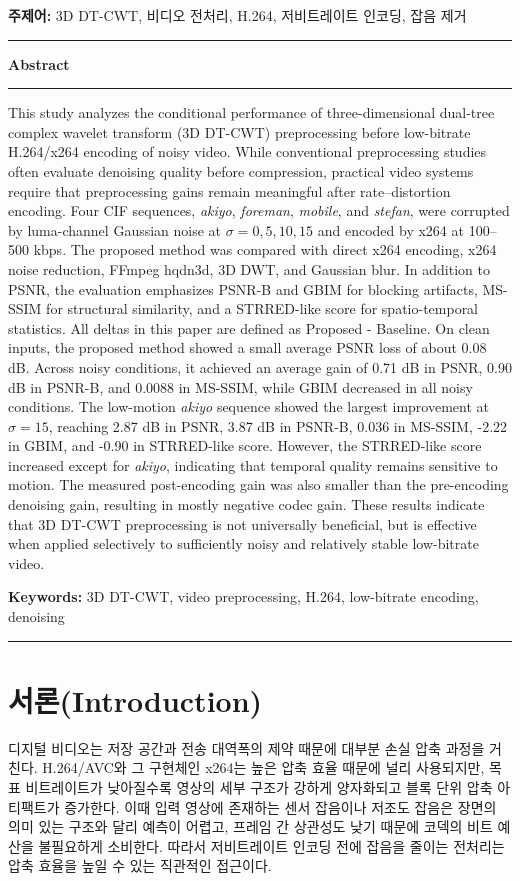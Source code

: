\documentclass[10pt]{article}
\begin{document}
\begin{center}
\begin{flushleft}
\textbf{주제어:} 3D DT-CWT, 비디오 전처리, H.264, 저비트레이트 인코딩, 잡음 제거
\noindent\rule{\textwidth}{0.4pt}
\end{flushleft}

{\large \bf Abstract}
\noindent\rule{\textwidth}{0.4pt}
\begin{flushleft}
This study analyzes the conditional performance of three-dimensional dual-tree complex wavelet transform (3D DT-CWT) preprocessing before low-bitrate H.264/x264 encoding of noisy video. While conventional preprocessing studies often evaluate denoising quality before compression, practical video systems require that preprocessing gains remain meaningful after rate--distortion encoding. Four CIF sequences, \textit{akiyo}, \textit{foreman}, \textit{mobile}, and \textit{stefan}, were corrupted by luma-channel Gaussian noise at $\sigma=0,5,10,15$ and encoded by x264 at 100--500 kbps. The proposed method was compared with direct x264 encoding, x264 noise reduction, FFmpeg hqdn3d, 3D DWT, and Gaussian blur. In addition to PSNR, the evaluation emphasizes PSNR-B and GBIM for blocking artifacts, MS-SSIM for structural similarity, and a STRRED-like score for spatio-temporal statistics. All deltas in this paper are defined as Proposed - Baseline. On clean inputs, the proposed method showed a small average PSNR loss of about 0.08 dB. Across noisy conditions, it achieved an average gain of 0.71 dB in PSNR, 0.90 dB in PSNR-B, and 0.0088 in MS-SSIM, while GBIM decreased in all noisy conditions. The low-motion \textit{akiyo} sequence showed the largest improvement at $\sigma=15$, reaching 2.87 dB in PSNR, 3.87 dB in PSNR-B, 0.036 in MS-SSIM, -2.22 in GBIM, and -0.90 in STRRED-like score. However, the STRRED-like score increased except for \textit{akiyo}, indicating that temporal quality remains sensitive to motion. The measured post-encoding gain was also smaller than the pre-encoding denoising gain, resulting in mostly negative codec gain. These results indicate that 3D DT-CWT preprocessing is not universally beneficial, but is effective when applied selectively to sufficiently noisy and relatively stable low-bitrate video.

\textbf{Keywords:} 3D DT-CWT, video preprocessing, H.264, low-bitrate encoding, denoising
\noindent\rule{\textwidth}{0.4pt}
\end{flushleft}
\end{center}

\section{\large \bf 서론(Introduction)}
디지털 비디오는 저장 공간과 전송 대역폭의 제약 때문에 대부분 손실 압축 과정을 거친다. H.264/AVC와 그 구현체인 x264는 높은 압축 효율 때문에 널리 사용되지만, 목표 비트레이트가 낮아질수록 영상의 세부 구조가 강하게 양자화되고 블록 단위 압축 아티팩트가 증가한다. 이때 입력 영상에 존재하는 센서 잡음이나 저조도 잡음은 장면의 의미 있는 구조와 달리 예측이 어렵고, 프레임 간 상관성도 낮기 때문에 코덱의 비트 예산을 불필요하게 소비한다. 따라서 저비트레이트 인코딩 전에 잡음을 줄이는 전처리는 압축 효율을 높일 수 있는 직관적인 접근이다.
\end{document}
